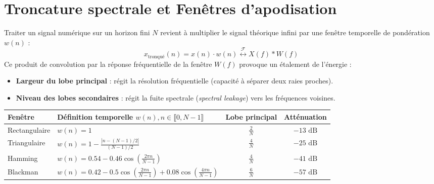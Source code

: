 \section{Troncature spectrale et Fenêtres d'apodisation}

Traiter un signal numérique sur un horizon fini $N$ revient à multiplier le signal théorique infini par une fenêtre temporelle de pondération $w(n)$ :
$$ x_{\text{tronqué}}(n) = x(n) \cdot w(n) \overset{\mathcal{F}}{\longleftrightarrow} X(f) * W(f) $$
Ce produit de convolution par la réponse fréquentielle de la fenêtre $W(f)$ provoque un étalement de l'énergie :
\begin{itemize}
    \item \textbf{Largeur du lobe principal} : régit la résolution fréquentielle (capacité à séparer deux raies proches).
    \item \textbf{Niveau des lobes secondaires} : régit la fuite spectrale (\emph{spectral leakage}) vers les fréquences voisines.
\end{itemize}

\begin{proposition}
    \begin{center}
        \renewcommand{\arraystretch}{1.5}
        \begin{tabular}{llcc}
            \toprule
            \textbf{Fenêtre} & \textbf{Définition temporelle} $w(n), n \in \llbracket 0, N-1 \rrbracket$ & \textbf{Lobe principal} & \textbf{Atténuation} \\
            \midrule
            Rectangulaire & $w(n) = 1$ & $\frac{2}{N}$ & $-13\text{ dB}$ \\
            Triangulaire & $w(n) = 1 - \frac{|n - (N-1)/2|}{(N-1)/2}$ & $\frac{4}{N}$ & $-25\text{ dB}$ \\
            Hamming & $w(n) = 0.54 - 0.46 \cos\left(\frac{2\pi n}{N-1}\right)$ & $\frac{4}{N}$ & $-41\text{ dB}$ \\
            Blackman & $w(n) = 0.42 - 0.5 \cos\left(\frac{2\pi n}{N-1}\right) + 0.08 \cos\left(\frac{4\pi n}{N-1}\right)$ & $\frac{6}{N}$ & $-57\text{ dB}$ \\
            \bottomrule
        \end{tabular}
    \end{center}
\end{proposition}